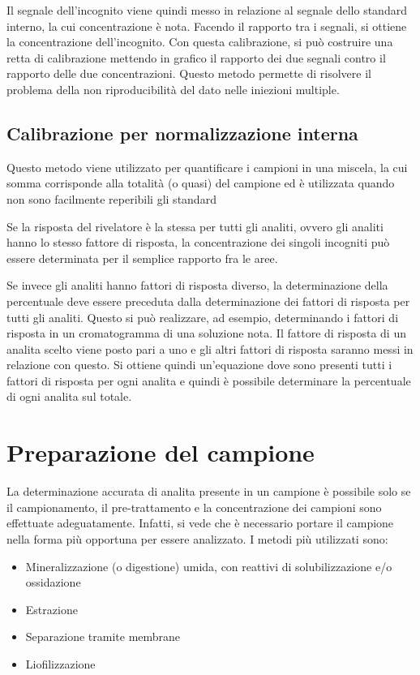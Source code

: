 
Il segnale dell'incognito viene quindi messo in relazione al segnale dello standard interno, la cui concentrazione è nota. Facendo il rapporto tra i segnali, si ottiene la concentrazione dell'incognito.
Con questa calibrazione, si può costruire una retta di calibrazione mettendo in grafico il rapporto dei due segnali contro il rapporto delle due concentrazioni.
Questo metodo permette di risolvere il problema della non riproducibilità del dato nelle iniezioni multiple.


\section{Calibrazione per normalizzazione interna}

Questo metodo viene utilizzato per quantificare i campioni in una miscela, la cui somma corrisponde alla totalità (o quasi) del campione ed è utilizzata quando non sono facilmente reperibili gli standard

Se la risposta del rivelatore è la stessa per tutti gli analiti, ovvero gli analiti hanno lo stesso fattore di risposta, la concentrazione dei singoli incogniti può
essere determinata per il semplice rapporto fra le aree.

Se invece gli analiti hanno fattori di risposta diverso, la determinazione della percentuale deve essere preceduta dalla determinazione dei fattori di risposta per tutti gli analiti.
Questo si può realizzare, ad esempio, determinando i fattori di risposta in un cromatogramma di una soluzione nota.
Il fattore di risposta di un analita scelto viene posto pari a uno e gli altri fattori di risposta saranno messi in relazione con questo.
Si ottiene quindi un'equazione dove sono presenti tutti i fattori di risposta per ogni analita e quindi è possibile determinare la percentuale di ogni analita sul totale.


\chapter{Preparazione del campione}
La determinazione accurata di analita presente in un campione è possibile solo se il campionamento, il pre-trattamento e la concentrazione dei campioni sono effettuate adeguatamente.
Infatti, si vede che è necessario portare il campione nella forma più opportuna per essere analizzato.
I metodi più utilizzati sono:
\begin{itemize}
\item  Mineralizzazione (o digestione) umida, con reattivi di solubilizzazione e/o ossidazione
\item Estrazione
\item Separazione tramite membrane
\item Liofilizzazione
\end{itemize}

